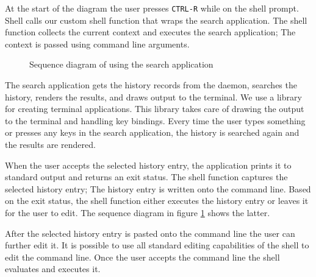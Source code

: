 At the start of the diagram the user presses \verb|CTRL-R| while on the shell prompt. Shell calls our custom shell function that wraps the search application. The shell function collects the current context and executes the search application; The context is passed using command line arguments. 


\begin{figure}
\centering
  \caption{Sequence diagram of using the search application}
  \label{impl-search-app-sequence}
\end{figure}


The search application gets the history records from the daemon, searches the history, renders the results, and draws output to the terminal. We use a library\cite{lib-gocui} for creating terminal applications. This library takes care of drawing the output to the terminal and handling key bindings. Every time the user types something or presses any keys in the search application, the history is searched again and the results are rendered. 

When the user accepts the selected history entry, the application prints it to standard output and returns an exit status. 
The shell function captures the selected history entry; The history entry is written onto the command line. Based on the exit status, the shell function either executes the history entry or leaves it for the user to edit. The sequence diagram in figure \ref{impl-search-app-sequence} shows the latter. 

After the selected history entry is pasted onto the command line the user can further edit it. 
It is possible to use all standard editing capabilities of the shell to edit the command line.
Once the user accepts the command line the shell evaluates and executes it.




